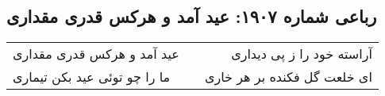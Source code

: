 \begin{center}
\section*{رباعی شماره ۱۹۰۷: عید آمد و هرکس قدری مقداری}
\label{sec:1907}
\begin{longtable}{l p{0.5cm} r}
عید آمد و هرکس قدری مقداری
&&
آراسته خود را ز پی دیداری
\\
ما را چو توئی عید بکن تیماری
&&
ای خلعت گل فکنده بر هر خاری
\\
\end{longtable}
\end{center}
